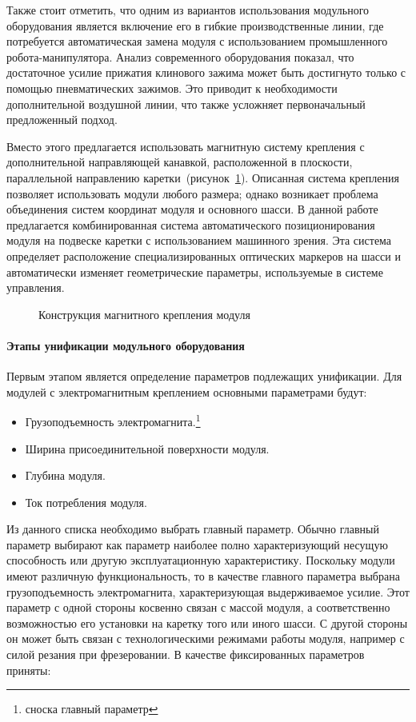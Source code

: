 Также стоит отметить, что одним из вариантов использования модульного оборудования является включение его в гибкие производственные линии, где потребуется автоматическая замена модуля с использованием промышленного робота-манипулятора. Анализ современного оборудования показал, что достаточное усилие прижатия клинового зажима может быть достигнуто только с помощью пневматических зажимов. Это приводит к необходимости дополнительной воздушной линии, что также усложняет первоначальный предложенный подход.

Вместо этого предлагается использовать магнитную систему крепления с дополнительной направляющей канавкой, расположенной в плоскости, параллельной направлению каретки~(рисунок~\cref{fig:quick-mount}). Описанная система крепления позволяет использовать модули любого размера; однако возникает проблема объединения систем координат модуля и основного шасси. В данной работе предлагается комбинированная система автоматического позиционирования модуля на подвеске каретки с использованием машинного зрения. Эта система определяет расположение специализированных оптических маркеров на шасси и автоматически изменяет геометрические параметры, используемые в системе управления.

\begin{figure}[ht]
	\caption{Конструкция магнитного крепления модуля}\label{fig:quick-mount}
\end{figure}

\paragraph{Этапы унификации модульного оборудования}

Первым этапом является определение параметров подлежащих унификации. Для модулей с электромагнитным креплением основными параметрами будут:

\begin{itemize}
	\item Грузоподъемность электромагнита.\footnote{сноска главный параметр}
	\item Ширина присоединительной поверхности модуля. 
	\item Глубина модуля.
	\item Ток потребления модуля.
\end{itemize}



Из данного списка необходимо выбрать главный параметр. Обычно главный параметр выбирают как параметр наиболее полно характеризующий несущую способность или другую эксплуатационную характеристику. Поскольку модули имеют различную функциональность, то в качестве главного параметра выбрана грузоподъемность электромагнита, характеризующая выдерживаемое усилие. Этот параметр с одной стороны косвенно связан с массой модуля, а соответственно возможностью его установки на каретку того или иного шасси. С другой стороны он может быть связан с технологическими режимами работы модуля, например с силой резания при фрезеровании. В качестве фиксированных параметров приняты:

